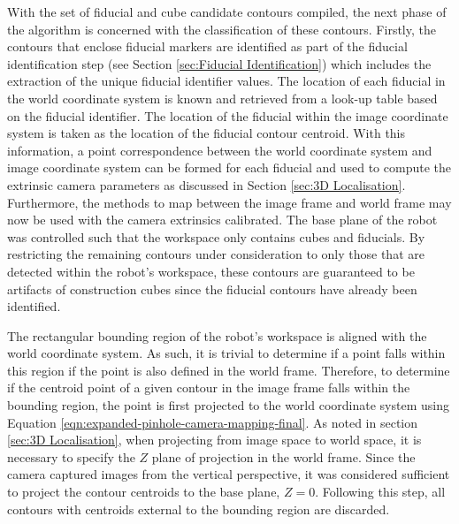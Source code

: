 With the set of fiducial and cube candidate contours compiled, the next phase of the algorithm is concerned with the classification of these contours. Firstly, the contours that enclose fiducial markers are identified as part of the fiducial identification step (see Section \ref{sec:Fiducial Identification}) which includes the extraction of the unique fiducial identifier values. The location of each fiducial in the world coordinate system is known and retrieved from a look-up table based on the fiducial identifier. The location of the fiducial within the image coordinate system is taken as the location of the fiducial contour centroid. With this information, a point correspondence between the world coordinate system and image coordinate system can be formed for each fiducial and used to compute the extrinsic camera parameters as discussed in Section \ref{sec:3D Localisation}. Furthermore, the methods to map between the image frame and world frame may now be used with the camera extrinsics calibrated. The base plane of the robot was controlled such that the workspace only contains cubes and fiducials. By restricting the remaining contours under consideration to only those that are detected within the robot's workspace, these contours are guaranteed to be artifacts of construction cubes since the fiducial contours have already been identified.

The rectangular bounding region of the robot's workspace is aligned with the world coordinate system. As such, it is trivial to determine if a point falls within this region if the point is also defined in the world frame. Therefore, to determine if the centroid point of a given contour in the image frame falls within the bounding region, the point is first projected to the world coordinate system using Equation \ref{eqn:expanded-pinhole-camera-mapping-final}. As noted in section \ref{sec:3D Localisation}, when projecting from image space to world space, it is necessary to specify the $Z$ plane of projection in the world frame. Since the camera captured images from the vertical perspective, it was considered sufficient to project the contour centroids to the base plane, $Z=0$. Following this step, all contours with centroids external to the bounding region are discarded.

